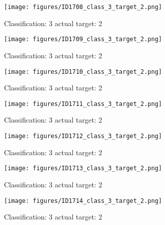 \begin{figure}[h!]
\begin{center}
\texttt{[image: figures/ID1708\_class\_3\_target\_2.png]}
\end{center}
\caption{ Classification: 3 actual target: 2}
\label{fig:ID1708_class_3_target_2}
\end{figure}
\begin{figure}[h!]
\begin{center}
\texttt{[image: figures/ID1709\_class\_3\_target\_2.png]}
\end{center}
\caption{ Classification: 3 actual target: 2}
\label{fig:ID1709_class_3_target_2}
\end{figure}
\begin{figure}[h!]
\begin{center}
\texttt{[image: figures/ID1710\_class\_3\_target\_2.png]}
\end{center}
\caption{ Classification: 3 actual target: 2}
\label{fig:ID1710_class_3_target_2}
\end{figure}
\begin{figure}[h!]
\begin{center}
\texttt{[image: figures/ID1711\_class\_3\_target\_2.png]}
\end{center}
\caption{ Classification: 3 actual target: 2}
\label{fig:ID1711_class_3_target_2}
\end{figure}
\begin{figure}[h!]
\begin{center}
\texttt{[image: figures/ID1712\_class\_3\_target\_2.png]}
\end{center}
\caption{ Classification: 3 actual target: 2}
\label{fig:ID1712_class_3_target_2}
\end{figure}
\begin{figure}[h!]
\begin{center}
\texttt{[image: figures/ID1713\_class\_3\_target\_2.png]}
\end{center}
\caption{ Classification: 3 actual target: 2}
\label{fig:ID1713_class_3_target_2}
\end{figure}
\begin{figure}[h!]
\begin{center}
\texttt{[image: figures/ID1714\_class\_3\_target\_2.png]}
\end{center}
\caption{ Classification: 3 actual target: 2}
\label{fig:ID1714_class_3_target_2}
\end{figure}
